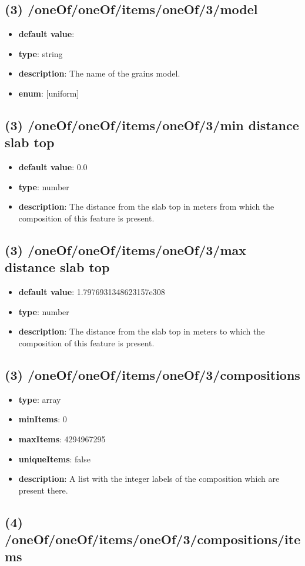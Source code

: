 \subsection{(3) /oneOf/oneOf/items/oneOf/3/model}
\begin{itemize}[leftmargin=3em]\item {\bf default value}: 
\item {\bf type}: string
\item {\bf description}: The name of the grains model.
\item {\bf enum}: [uniform]\end{itemize}\subsection{(3) /oneOf/oneOf/items/oneOf/3/min distance slab top}
\begin{itemize}[leftmargin=3em]\item {\bf default value}: 0.0
\item {\bf type}: number
\item {\bf description}: The distance from the slab top in meters from which the composition of this feature is present.
\end{itemize}\subsection{(3) /oneOf/oneOf/items/oneOf/3/max distance slab top}
\begin{itemize}[leftmargin=3em]\item {\bf default value}: 1.7976931348623157e308
\item {\bf type}: number
\item {\bf description}: The distance from the slab top in meters to which the composition of this feature is present.
\end{itemize}\subsection{(3) /oneOf/oneOf/items/oneOf/3/compositions}
\begin{itemize}[leftmargin=3em]\item {\bf type}: array
\item {\bf minItems}: 0
\item {\bf maxItems}: 4294967295
\item {\bf uniqueItems}: false
\item {\bf description}: A list with the integer labels of the composition which are present there.
\end{itemize}\subsection{(4) /oneOf/oneOf/items/oneOf/3/compositions/items}
